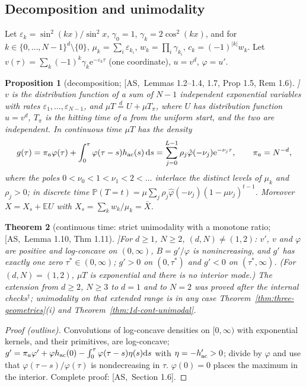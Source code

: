\documentclass[10pt,a4paper]{article}
\theoremstyle{plain}
\newtheorem{theorem}{Theorem}[section]
\newtheorem{proposition}[theorem]{Proposition}
\theoremstyle{definition}
\newcommand{\NEW}{\ensuremath{^{\dagger}}}       %
\newcommand{\src}[2]{[\textsf{#1},~#2]}           %
\newcommand{\ASY}{\textsf{AS}}
\newcommand{\E}{\mathbb{E}}
\renewcommand{\P}{\mathbb{P}}
\newcommand{\ee}{\mathrm{e}}
\newcommand{\dd}{\mathrm{d}}
\newcommand{\Xb}{\bar X}
\begin{document}
\subsection{Decomposition and unimodality}

Let $\varepsilon_k=\sin^2(kx)/\sin^2x$, $\gamma_0=1$, $\gamma_k=2\cos^2(kx)$, and for $k\in\{0,\dots,N-1\}^d\setminus\{0\}$, $\mu_k=\sum_i\varepsilon_{k_i}$, $w_k=\prod_i\gamma_{k_i}$, $c_k=(-1)^{|k|}w_k$. Let $v(\tau)=\sum_k(-1)^k\gamma_k\ee^{-\varepsilon_k\tau}$ (one coordinate), $u=v^d$, $\varphi=u'$.

\begin{proposition}[decomposition; \src{\ASY}{Lemmas 1.2--1.4, 1.7, Prop 1.5, Rem 1.6}]\label{prop:decomposition}
$v$ is the distribution function of a sum of $N-1$ independent exponential variables with rates $\varepsilon_1,\dots,\varepsilon_{N-1}$, and $\mu T\overset d=U+\mu T_\pi$, where $U$ has distribution function $u=v^d$, $T_\pi$ is the hitting time of $a$ from the uniform start, and the two are independent. In continuous time $\mu T$ has the density
\[
g(\tau)=\pi_a\varphi(\tau)+\int_0^\tau\varphi(\tau-s)h_{\rm ac}(s)\,\dd s=\sum_{j=0}^{L-1}\rho_j\hat\varphi(-\nu_j)\ee^{-\nu_j\tau},\qquad \pi_a=N^{-d},
\]
where the poles $0<\nu_0<1<\nu_1<2<\dots$ interlace the distinct levels of $\mu_k$ and $\rho_j>0$; in discrete time $\P(T=t)=\mu\sum_j\rho_j\hat\varphi(-\nu_j)(1-\mu\nu_j)^{t-1}$. Moreover $X=X_s+\E U$ with $X_s=\sum_kw_k/\mu_k=\Xb$.
\end{proposition}

\begin{theorem}[continuous time: strict unimodality with a monotone ratio; \src{\ASY}{Lemma 1.10, Thm 1.11}]\label{thm:as-unimodal}
For $d\ge1$, $N\ge2$, $(d,N)\ne(1,2)$: $v'$, $v$ and $\varphi$ are positive and log-concave on $(0,\infty)$, $B=g'/\varphi$ is nonincreasing, and $g'$ has exactly one zero $\tau^*\in(0,\infty)$; $g'>0$ on $(0,\tau^*)$ and $g'<0$ on $(\tau^*,\infty)$. (For $(d,N)=(1,2)$, $\mu T$ is exponential and there is no interior mode.) The extension from $d\ge2$, $N\ge3$ to $d=1$ and to $N=2$ was proved after the internal checks\NEW; unimodality on that extended range is in any case Theorem~\ref{thm:three-geometries}(i) and Theorem~\ref{thm:1d-cont-unimodal}.
\end{theorem}
\begin{proof}[Proof (outline)]
Convolutions of log-concave densities on $[0,\infty)$ with exponential kernels, and their primitives, are log-concave; $g'=\pi_a\varphi'+\varphi h_{\rm ac}(0)-\int_0^\tau\varphi(\tau-s)\eta(s)\dd s$ with $\eta=-h_{\rm ac}'>0$; divide by $\varphi$ and use that $\varphi(\tau-s)/\varphi(\tau)$ is nondecreasing in $\tau$. $\varphi(0)=0$ places the maximum in the interior. Complete proof: \src{\ASY}{Section 1.6}.
\end{proof}
\end{document}
